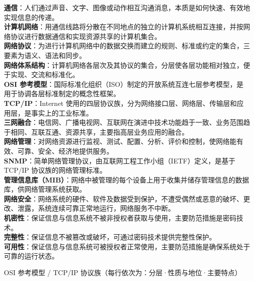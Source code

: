\documentclass[a4paper,11pt]{article}
\begin{document}
\begin{keyterms}
\textbf{通信}：人们通过声音、文字、图像或动作相互沟通消息，本质是如何快速、有效地实现信息的传递。\\
\textbf{计算机网络}：用通信线路将分散在不同地点的独立的计算机系统相互连接，并按网络协议进行数据通信和实现资源共享的计算机集合。\\
\textbf{网络协议}：为进行计算机网络中的数据交换而建立的规则、标准或约定的集合，三要素为语义、语法和同步。\\
\textbf{网络体系结构}：计算机网络各层次及其协议的集合，分层使各层功能相对独立，便于实现、交流和标准化。\\
\textbf{OSI 参考模型}：国际标准化组织（ISO）制定的开放系统互连七层参考模型，是用于协调各层标准制定的概念性框架。\\
\textbf{TCP/IP}：Internet 使用的四层协议族，分为网络接口层、网络层、传输层和应用层，是事实上的工业标准。\\
\textbf{三网融合}：电信网、广播电视网、互联网在演进中技术功能趋于一致、业务范围趋于相同、互联互通、资源共享，主要指高层业务应用的融合。\\
\textbf{网络管理}：对网络资源进行监视、测试、配置、分析、评价和控制，使网络能有效、可靠、安全、经济地提供服务。\\
\textbf{SNMP}：简单网络管理协议，由互联网工程工作小组（IETF）定义，是基于 TCP/IP 协议族的网络管理标准。\\
\textbf{管理信息库（MIB）}：网络中被管理的每个设备上用于收集并储存管理信息的数据库，供网络管理系统获取。\\
\textbf{网络安全}：网络系统的硬件、软件及数据受到保护，不遭受偶然或恶意的破坏、更改、泄露，系统连续可靠正常地运行，网络服务不中断。\\
\textbf{机密性}：保证信息与信息系统不被非授权者获取与使用，主要防范措施是密码技术。\\
\textbf{完整性}：保证信息不被篡改或破坏，可通过密码技术提供完整性保护。\\
\textbf{可用性}：保证信息与信息系统可被授权者正常使用，主要防范措施是确保系统处于可靠的运行状态。
\end{keyterms}

\begin{contrast}{OSI 参考模型 / TCP/IP 协议族（每行依次为：分层·性质与地位·主要特点）}
\end{contrast}
\end{document}
